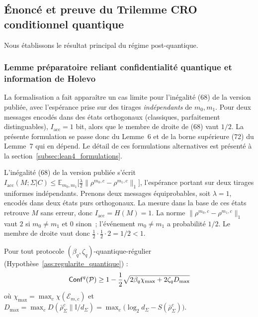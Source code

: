 \subsection{\'Enonc\'e et preuve du Trilemme CRO conditionnel quantique}
\label{subsec:enonce_preuve_pq}
\begin{sloppypar}
Nous \'etablissons le r\'esultat principal du r\'egime post-quantique.

\subsubsection{Lemme pr\'eparatoire reliant confidentialit\'e quantique et information de Holevo}
\label{subsubsec:lemme_conf_mi_pq}

\begin{remark}
\label{rem:retrait_lemma6}
La formalisation a fait appara\^itre un cas limite pour l'in\'egalit\'e (68)
de la version publi\'ee, avec l'esp\'erance prise sur des tirages
\emph{ind\'ependants} de $m_0, m_1$. Pour deux messages encod\'es dans des \'etats orthogonaux
(classiques, parfaitement distinguables), $I_{\mathrm{acc}} = 1$ bit,
alors que le membre de droite de (68) vaut $1/2$. La pr\'esente formulation
se passe donc du Lemme~6 et de la borne sup\'erieure (72) du Lemme~7 qui en
d\'epend. Le d\'etail de ces formulations alternatives est pr\'esent\'e \`a la
section~\ref{subsec:lean4_formulations}.
\end{remark}

\begin{Preuve}
L'in\'egalit\'e (68) de la version publi\'ee s'\'ecrit
$I_{\mathrm{acc}}(M;\Sigma|C) \leq \mathbb{E}_{m_0,m_1}\bigl[\tfrac{\lambda}{2}\|\rho^{m_0,c} - \rho^{m_1,c}\|_1\bigr]$,
l'esp\'erance portant sur deux tirages uniformes ind\'ependants. Prenons deux
messages \'equiprobables, soit $\lambda = 1$, encod\'es dans deux \'etats purs
orthogonaux. La mesure dans la base de ces \'etats retrouve $M$ sans erreur,
donc $I_{\mathrm{acc}} = H(M) = 1$. La norme $\|\rho^{m_0,c} - \rho^{m_1,c}\|_1$ vaut
$2$ si $m_0 \neq m_1$ et $0$ sinon~; l'\'ev\'enement $m_0 \neq m_1$ a probabilit\'e
$1/2$. Le membre de droite vaut donc $\tfrac12 \cdot \tfrac12 \cdot 2 = 1/2 < 1$.
\end{Preuve}

\begin{lemma}
\label{lem:q_conf_mi_pq}
Pour tout protocole $(\beta_q, \zeta_q)$-quantique-r\'egulier
(Hypoth\`ese~\ref{ass:regularite_quantique}) :
\begin{equation}
\mathsf{Conf}^q(\mathcal{P}) \geq 1 - \frac{1}{2}\sqrt{2\beta_q \chi_{\max} + 2\zeta_q D_{\max}}
\label{eq:conf_lower_pq}
\end{equation}
o\`u $\chi_{\max} = \max_c \chi(\mathcal{E}_{m,c})$ et
$D_{\max} = \max_c D(\bar{\rho}_\Sigma^c \| \mathbb{I}/d_\Sigma)
= \max_c\bigl(\log_2 d_\Sigma - S(\bar{\rho}_\Sigma^c)\bigr)$.
\end{lemma}


\end{sloppypar}
